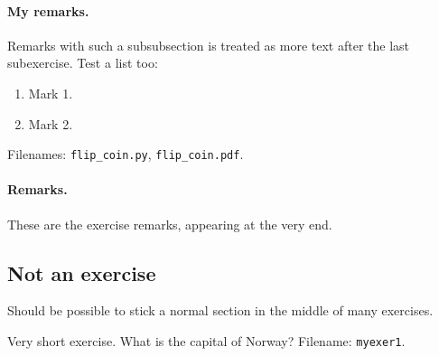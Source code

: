 \documentclass[%
oneside,                 %
final,                   %
10pt]{article}
\newenvironment{doconceexercise}{}{}
\newcounter{doconceexercisecounter}
\theoremstyle{definition}
\begin{document}
\begin{enumerate}
\begin{doconceexercise}
\paragraph{My remarks.}
Remarks with such a subsubsection is treated as more text
after the last subexercise. Test a list too:

\begin{enumerate}
\item Mark 1.

\item Mark 2.
\end{enumerate}

\noindent
\noindent Filenames: \Verb!flip_coin.py!, \Verb!flip_coin.pdf!.


\paragraph{Remarks.}
These are the exercise remarks, appearing at the very end.


\end{doconceexercise}

\subsection{Not an exercise}

Should be possible to stick a normal section in the middle of many
exercises.

\begin{doconceexercise}

                             
\label{my:exer1}

Very short exercise. What is the capital
of Norway?
\noindent Filename: \texttt{myexer1}.

\end{doconceexercise}

\begin{doconceexercise}

                             

\end{doconceexercise}
\end{enumerate}
\end{document}
